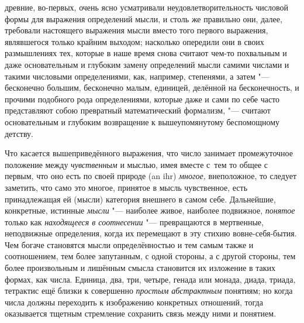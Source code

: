 древние, во-первых, очень ясно усматривали неудовлетворительность числовой
формы для выражения определений мысли, и столь же правильно они, далее,
требовали настоящего выражения мысли вместо того первого выражения, являвшегося
только крайним выходом; насколько опередили они в своих размышлениях тех,
которые в наше время снова считают чем-то похвальным и даже основательным и
глубоким замену определений мысли самими числами и такими числовыми
определениями, как, например, степенями, а затем "--- бесконечно большим,
бесконечно малым, единицей, делённой на бесконечность, и прочими подобного рода
определениями, которые даже и сами по себе часто представляют собою
превратный математический формализм, "--- считают основательным и глубоким
возвращение к вышеупомянутому беспомощному детству.

Что касается вышеприведённого выражения, что число занимает промежуточное
положение между {\em чувственным} и мыслью, имея вместе с~тем то общее с
первым, что оно есть по своей природе (an ihr) {\em многое,} внеположное, то
следует заметить, что само это многое, принятое в мысль чувственное, есть
принадлежащая ей (мысли) категория внешнего в самом себе. Дальнейшие,
конкретные, истинные {\em мысли} "--- наиболее живое, наиболее
подвижное, {\em понятое} только как {\em находящееся в соотнесении} "--- превращаются в мертвенные,
неподвижные определения, когда их перемещают в эту стихию вовне-себя-бытия. Чем
богаче становятся мысли определённостью и тем самым также и соотношением, тем
более запутанным, с одной стороны, а с другой стороны, тем более произвольным и
лишённым смысла становится их изложение в таких формах, как числа. Единица,
два, три, четыре, генада или монада, диада, триада, тетрактис ещё близки к
совершенно {\em простым абстрактным} понятиям; но когда числа должны
переходить к изображению конкретных отношений, тогда оказывается тщетным
стремление сохранить связь между ними и понятием.

